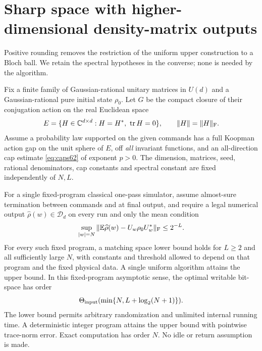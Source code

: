 \section{Sharp space with higher-dimensional density-matrix outputs}
\label{sec:matrixspace65}
Positive rounding removes the restriction of the uniform upper
construction to a Bloch ball. We retain the spectral hypotheses in the
converse; none is needed by the algorithm.

\begin{theorem}\label{thm:matrixspace65}
Fix a finite family of Gaussian-rational unitary matrices in $U(d)$
and a Gaussian-rational pure initial state $\rho_0$. Let $G$ be the
compact closure of their conjugation action on the real Euclidean
space
\[
 E=\{H\in\mathbb C^{d\times d}:H=H^*,\ \operatorname{tr} H=0\},
 \qquad \|H\|=\|H\|_{\rm F}.
\]
Assume a probability law supported on the given commands has a full
Koopman action gap on the unit sphere of $E$, off
\emph{all} invariant functions, and an all-direction cap estimate
\eqref{eq:caps62} of exponent $p>0$. The dimension, matrices, seed,
rational denominators, cap constants and spectral constant are fixed
independently of $N,L$.

For a single fixed-program classical one-pass simulator, assume
almost-sure termination between commands and at final output, and require a
legal numerical output $\widehat\rho(w)\in\mathcal D_d$ on every run
and only the mean condition
\begin{equation}\label{eq:matrixmean65}
 \sup_{|w|=N}\|\mathbb E\widehat\rho(w)-U_w\rho_0U_w^*\|_{\rm F}\le2^{-L}.
\end{equation}
For every such fixed program, a matching space lower bound holds for
$L\ge2$ and all sufficiently large $N$, with constants and threshold
allowed to depend on that program and the fixed physical data.
A single uniform algorithm attains the upper bound. In this
fixed-program asymptotic sense, the optimal writable bit-space has order
\begin{equation}\label{eq:matrixspace65}
          \Theta_{\rm input}(\min\{N,L+\log_2(N+1)\}).
\end{equation}
The lower bound permits arbitrary randomization and unlimited
internal running time. A deterministic integer program attains the
upper bound with pointwise trace-norm error. Exact computation has
order $N$. No idle or return assumption is made.
\end{theorem}
